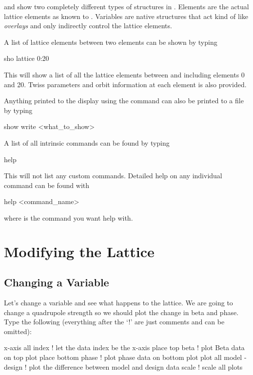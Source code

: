  and  show two completely different types of
structures in \tao. Elements are the actual lattice elements as known to \bmad. 
Variables are native \tao structures that act kind of like \bmad
\textit{overlays} and only indirectly control the lattice elements.

A list of lattice elements between two elements can be shown by typing 
\begin{example}
  sho lattice 0:20
\end{example}
This will show a list of all the lattice elements between and including elements
0 and 20. Twiss parameters and orbit information at each element is also
provided.

Anything printed to the display using the  command can also be printed
to a file by typing
\begin{example}
  show write <what_to_show>
\end{example}

A list of all intrinsic  commands can be found by typing
\begin{example}
  help
\end{example}
This will not list any custom commands. Detailed help on any individual command
can be found with
\begin{example}
  help <command\_name>
\end{example}
where  is the command you want help with.

\section{Modifying the Lattice}
\label{s:modify_lattice}

\subsection{Changing a Variable}
\label{ss:change_variable}

Let's change a variable and see what happens to the lattice. We are going to
change a quadrupole strength so we should plot the change in beta and phase.
Type the following (everything after the `!' are just comments and can be
omitted):
\begin{example}
  x-axis all index        ! let the data index be the x-axis
  place top beta          ! plot Beta data on top plot
  place bottom phase      ! plot phase data on bottom plot
  plot all model - design ! plot the difference between model and design data
  scale                   ! scale all plots
\end{example}

